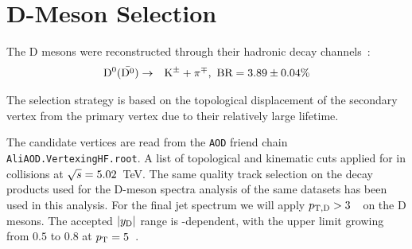\section{D-Meson Selection}
\label{sec:DmesonSel}

The D mesons were reconstructed through their hadronic decay channels~\cite{Tanabashi:2018oca}:
\begin{eqnarray*}
\mathrm{D^{0}} (\bar{\mathrm{D^{0}}}) &\to& {\rm K}^{\pm} + \pi^{\mp}  , {\text{ BR}} = 3.89\pm {0.04} \%\\
\end{eqnarray*}

The selection strategy is based on the topological displacement of the secondary vertex from the primary vertex due to their relatively large lifetime.

The candidate vertices are read from the \texttt{AOD} friend chain \texttt{AliAOD.VertexingHF.root}. A list of topological and kinematic cuts applied for \Dzero in \pp collisions at $\sqrt{s}=5.02$~TeV.
The same quality track selection on the decay products used for the D-meson spectra analysis of the same datasets has been used in this analysis.
For the final jet spectrum we will apply $p_{\mathrm{T,D}}> 3$~\GeVc\ on the D mesons. The accepted $|y_{\rm D}|$ range is \pt-dependent, with the upper limit growing from $0.5$ to $0.8$ at $p_{\rm T}=5$~\GeVc.

    
    
